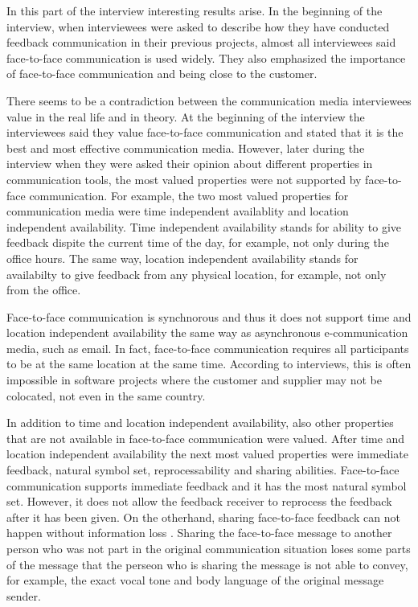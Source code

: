 \documentclass[english,12pt,a4paper,pdftex]{article}
\begin{document}

In this part of the interview interesting results arise. In the beginning of the interview, when interviewees were asked to describe how they have conducted feedback communication in their previous projects, almost all interviewees said face-to-face communication is used widely. They also emphasized the importance of face-to-face communication and being close to the customer. 

There seems to be a contradiction between the communication media interviewees value in the real life and in theory. At the beginning of the interview the interviewees said they value face-to-face communication and stated that it is the best and most effective communication media. However, later during the interview when they were asked their opinion about different properties in communication tools, the most valued properties were not supported by face-to-face communication. For example, the two most valued properties for communication media were time independent availablity and location independent availability. Time independent availability stands for ability to give feedback dispite the current time of the day, for example, not only during the office hours. The same way, location independent availability stands for availabilty to give feedback from any physical location, for example, not only from the office.

Face-to-face communication is synchnorous and thus it does not support time and location independent availability the same way as asynchronous e-communication media, such as email. In fact, face-to-face communication requires all participants to be at the same location at the same time. According to interviews, this is often impossible in software projects where the customer and supplier may not be colocated, not even in the same country.

In addition to time and location independent availability, also other properties that are not available in face-to-face communication were valued. After time and location independent availability the next most valued properties were immediate feedback, natural symbol set, reprocessability and sharing abilities. Face-to-face communication supports immediate feedback and it has the most natural symbol set. However, it does not allow the feedback receiver to reprocess the feedback after it has been given. On the otherhand, sharing face-to-face feedback can not happen without information loss \citep{higa2007}. Sharing the face-to-face message to another person who was not part in the original communication situation loses some parts of the message that the perseon who is sharing the message is not able to convey, for example, the exact vocal tone and body language of the original message sender.
\end{document}
